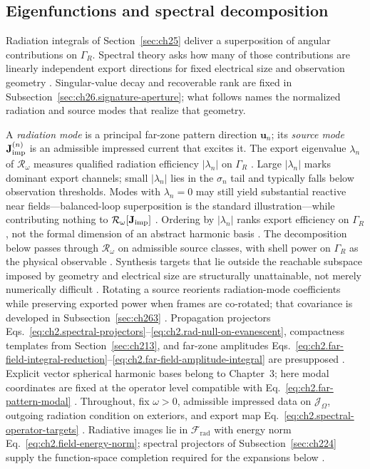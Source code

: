 \subsection{Eigenfunctions and spectral decomposition}
\label{sec:ch261}

Radiation integrals of Section~\ref{sec:ch25} deliver a superposition of angular contributions on
$\Gamma_R$. Spectral theory asks how many of those contributions are linearly independent export
directions for fixed electrical size and observation geometry \cite{stratton1941}. Singular-value
decay and recoverable rank are fixed in Subsection~\ref{sec:ch26.signature-aperture}; what follows
names the normalized radiation and source modes that realize that geometry.

A \emph{radiation mode} is a principal far-zone pattern direction $\mathbf{u}_n$; its \emph{source
mode} $\mathbf{J}_{\mathrm{imp}}^{(n)}$ is an admissible impressed current that excites it. The export eigenvalue
$\lambda_n$ of $\mathcal{R}_\omega$ measures qualified radiation efficiency $|\lambda_n|$ on
$\Gamma_R$ \cite{stratton1941}. Large $|\lambda_n|$ marks dominant export channels; small
$|\lambda_n|$ lies in the $\sigma_n$ tail and typically falls below observation thresholds.
Modes with $\lambda_n=0$ may still yield substantial reactive near fields---balanced-loop
superposition is the standard illustration---while contributing nothing to
$\mathcal{R}_\omega[\mathbf{J}_{\mathrm{imp}}]$ \cite{devaney2004}. Ordering by $|\lambda_n|$ ranks export efficiency on $\Gamma_R$, not the formal dimension of
an abstract harmonic basis \cite{hansen1988}. The decomposition below passes through $\mathcal{R}_\omega$ on
admissible source classes, with shell power on $\Gamma_R$ as the physical observable
\cite{stratton1941}. Synthesis targets that lie outside the reachable subspace imposed by geometry
and electrical size are structurally unattainable, not merely numerically difficult
\cite{harrington2001,collin2001}. Rotating a source reorients radiation-mode coefficients while
preserving exported power when frames are co-rotated; that covariance is developed in
Subsection~\ref{sec:ch263} \cite{stratton1941}.
Propagation projectors Eqs.~\eqref{eq:ch2.spectral-projectors}--\eqref{eq:ch2.rad-null-on-evanescent},
compactness templates from Section~\ref{sec:ch213}, and far-zone amplitudes
Eqs.~\eqref{eq:ch2.far-field-integral-reduction}--\eqref{eq:ch2.far-field-amplitude-integral}
are presupposed \cite{stratton1941}. Explicit vector spherical harmonic bases belong to
Chapter~3; here modal coordinates are fixed at the operator level compatible with
Eq.~\eqref{eq:ch2.far-pattern-modal} \cite{harrington2001}.
Throughout, fix $\omega>0$, admissible impressed data on $\mathcal{J}_\Omega$, outgoing radiation
condition on exteriors, and export map Eq.~\eqref{eq:ch2.spectral-operator-targets}
\cite{stratton1941}. Radiative images lie in $\mathcal{F}_{\mathrm{rad}}$ with energy norm
Eq.~\eqref{eq:ch2.field-energy-norm}; spectral projectors of Subsection~\ref{sec:ch224} supply
the function-space completion required for the expansions below \cite{harrington2001}.


